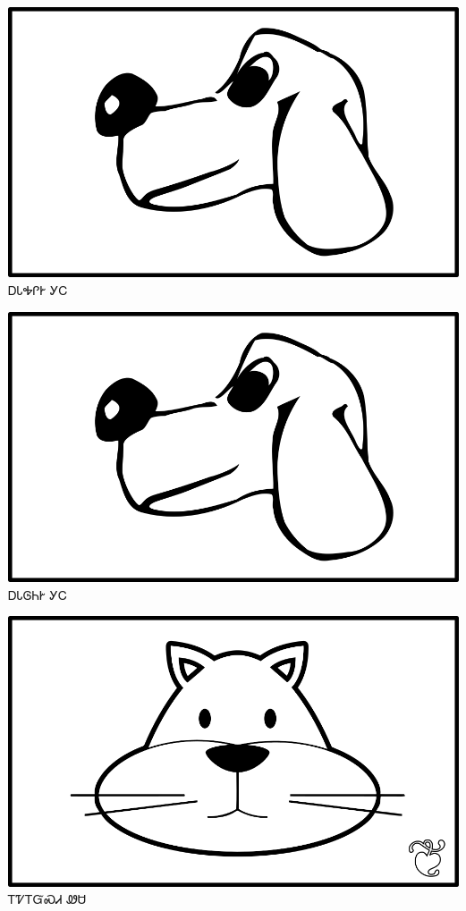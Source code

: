\documentclass[avery5371]{flashcards}%
\begin{document}
\begin{flashcard}{
\includegraphics[width=0.95\columnwidth,height=.51\columnwidth,keepaspectratio]{../artwork/for-colors/gihli}
}\Huge ᎠᏓᎭᎵᎨ ᎩᏟ
\end{flashcard}

\begin{flashcard}{
\includegraphics[width=0.95\columnwidth,height=.51\columnwidth,keepaspectratio]{../artwork/for-colors/gihli}
}\Huge ᎠᏓᎶᏂᎨ ᎩᏟ
\end{flashcard}

\begin{flashcard}{
\includegraphics[width=0.95\columnwidth,height=.51\columnwidth,keepaspectratio]{../artwork/for-colors/wesa-with-leaf}
}\Huge ᎢᏤᎢᏳᏍᏗ ᏪᏌ
\end{flashcard}
\end{document}
